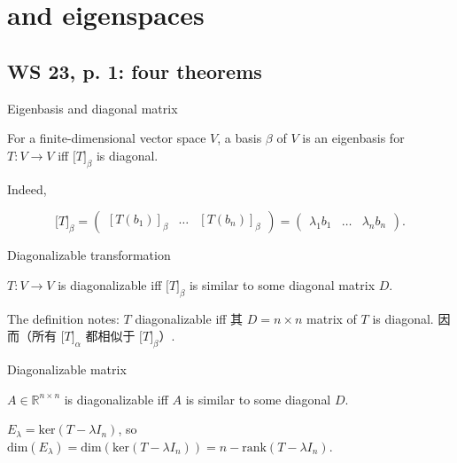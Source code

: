 \chapter{\texorpdfstring{ and eigenspaces}{ and eigenspaces}}

\section{WS 23, p. 1: four theorems}

\begin{theorem}{Eigenbasis and diagonal matrix}

For a finite-dimensional vector space \(V\), a basis \(\beta\) of \(V\) is an eigenbasis for \(T:V\rightarrow V\) iff \(\lbrack T\rbrack_{\beta}\) is diagonal.

\end{theorem}

Indeed,

\[\lbrack T\rbrack_{\beta} = \begin{pmatrix}
\left\lbrack {T\left( b_{1} \right)} \right\rbrack_{\beta} & \ldots & \left\lbrack {T\left( b_{n} \right)} \right\rbrack_{\beta}
\end{pmatrix} = \begin{pmatrix}
{\lambda_{1}b_{1}} & \ldots & {\lambda_{n}b_{n}}
\end{pmatrix}.\]

\begin{theorem}{Diagonalizable transformation}

\(T:V\rightarrow V\) is diagonalizable iff \(\lbrack T\rbrack_{\beta}\) is similar to some diagonal matrix \(D\).

\end{theorem}

The definition notes: \(T\) diagonalizable iff 其 \(D = n \times n\) matrix of \(T\) is diagonal. 因而（所有 \(\lbrack T\rbrack_{\alpha}\) 都相似于 \(\lbrack T\rbrack_{\beta}\)）.

\begin{theorem}{Diagonalizable matrix}

\(A \in \mathbb{R}^{n \times n}\) is diagonalizable iff \(A\) is similar to some diagonal \(D\).

\end{theorem}

\begin{theorem}{}

\(E_{\lambda} = \text{ker}\left( {T - \lambda I_{n}} \right)\), so \(\text{dim}\left( E_{\lambda} \right) = \text{dim}\left( {\text{ker}\left( {T - \lambda I_{n}} \right)} \right) = n - \text{rank}\left( {T - \lambda I_{n}} \right)\).

\end{theorem}

